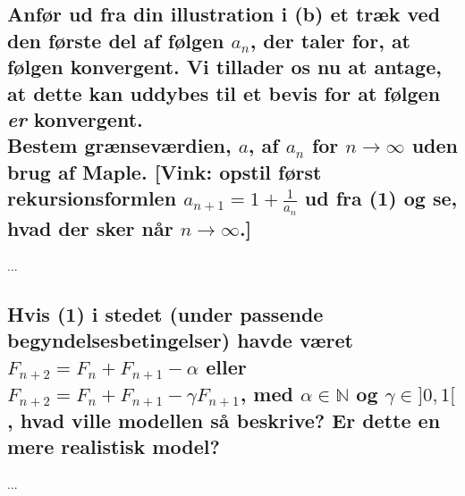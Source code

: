 \documentclass[11pt,a4paper]{article}
\begin{document}
\subsection
{
    \mdseries
    Anfør ud fra din illustration i (b) et træk ved den første del af følgen
    ${a_n}$, der taler for, at følgen konvergent. Vi tillader os nu at
    antage, at dette kan uddybes til et bevis for at følgen {\it er}
    konvergent.
    \\\indent
    Bestem grænseværdien, $a$, af $a_n$ for $n \rightarrow \infty$ uden brug
    af Maple. [Vink: opstil først rekursionsformlen $a_{n+1} = 1 +
    \frac{1}{a_n}$ ud fra (1) og se, hvad der sker når $n \rightarrow
    \infty$.]
}
...

\subsection
{
    \mdseries
    Hvis (1) i stedet (under passende begyndelsesbetingelser) havde været
    $F_{n+2} = F_n + F_{n+1} - \alpha$ eller $F_{n+2} = F_n + F_{n+1} -
    \gamma F_{n+1}$, med $\alpha \in \mathbb{N}$ og $\gamma \in ]0,1[$,
    hvad ville modellen så beskrive? Er dette en mere realistisk model?
}
...
\end{document}
